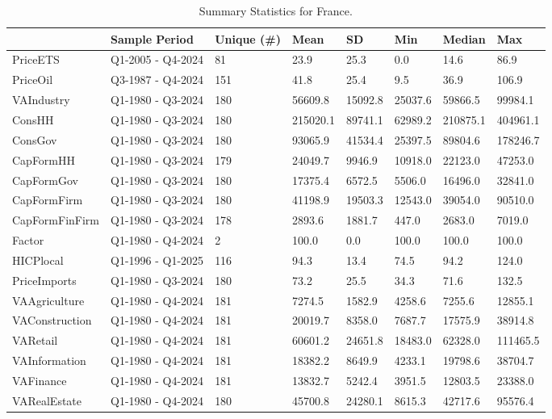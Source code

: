\begingroup\fontsize{7}{9}\selectfont

\begin{longtable}[t]{llllllll}
\caption{Summary Statistics for France.}\\
\toprule
  & Sample Period & Unique (\#) & Mean & SD & Min & Median & Max\\
\midrule
PriceETS & Q1-2005 - Q4-2024 & 81 & 23.9 & 25.3 & 0.0 & 14.6 & 86.9\\
PriceOil & Q3-1987 - Q4-2024 & 151 & 41.8 & 25.4 & 9.5 & 36.9 & 106.9\\
VAIndustry & Q1-1980 - Q3-2024 & 180 & 56609.8 & 15092.8 & 25037.6 & 59866.5 & 99984.1\\
ConsHH & Q1-1980 - Q3-2024 & 180 & 215020.1 & 89741.1 & 62989.2 & 210875.1 & 404961.1\\
ConsGov & Q1-1980 - Q3-2024 & 180 & 93065.9 & 41534.4 & 25397.5 & 89804.6 & 178246.7\\
\addlinespace
CapFormHH & Q1-1980 - Q3-2024 & 179 & 24049.7 & 9946.9 & 10918.0 & 22123.0 & 47253.0\\
CapFormGov & Q1-1980 - Q3-2024 & 180 & 17375.4 & 6572.5 & 5506.0 & 16496.0 & 32841.0\\
CapFormFirm & Q1-1980 - Q3-2024 & 180 & 41198.9 & 19503.3 & 12543.0 & 39054.0 & 90510.0\\
CapFormFinFirm & Q1-1980 - Q3-2024 & 178 & 2893.6 & 1881.7 & 447.0 & 2683.0 & 7019.0\\
Factor & Q1-1980 - Q4-2024 & 2 & 100.0 & 0.0 & 100.0 & 100.0 & 100.0\\
\addlinespace
HICPlocal & Q1-1996 - Q1-2025 & 116 & 94.3 & 13.4 & 74.5 & 94.2 & 124.0\\
PriceImports & Q1-1980 - Q3-2024 & 180 & 73.2 & 25.5 & 34.3 & 71.6 & 132.5\\
VAAgriculture & Q1-1980 - Q4-2024 & 181 & 7274.5 & 1582.9 & 4258.6 & 7255.6 & 12855.1\\
VAConstruction & Q1-1980 - Q4-2024 & 181 & 20019.7 & 8358.0 & 7687.7 & 17575.9 & 38914.8\\
VARetail & Q1-1980 - Q4-2024 & 181 & 60601.2 & 24651.8 & 18483.0 & 62328.0 & 111465.5\\
\addlinespace
VAInformation & Q1-1980 - Q4-2024 & 181 & 18382.2 & 8649.9 & 4233.1 & 19798.6 & 38704.7\\
VAFinance & Q1-1980 - Q4-2024 & 181 & 13832.7 & 5242.4 & 3951.5 & 12803.5 & 23388.0\\
VARealEstate & Q1-1980 - Q4-2024 & 180 & 45700.8 & 24280.1 & 8615.3 & 42717.6 & 95576.4\\

\end{longtable}
